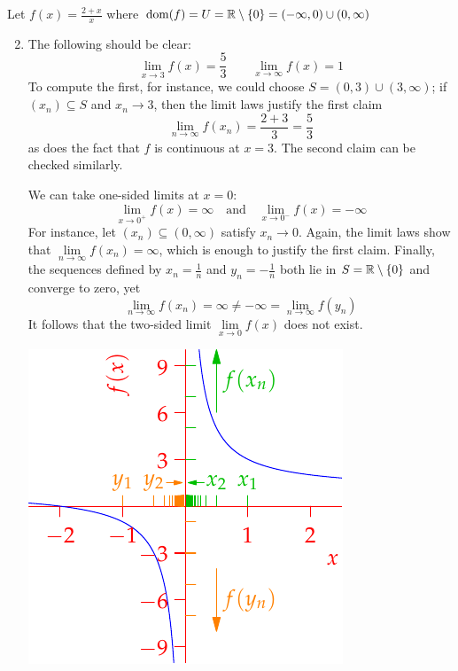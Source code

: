 \begin{examples}{}{}
\exstart Let $f(x)=\frac{2+x}x$ where $\operatorname{dom}(f)=U=\mathbb{R}\setminus\{0\}=(-\infty,0)\cup(0,\infty)$
\begin{enumerate}\setcounter{enumi}{1}
  \item[]	The following should be clear:
	\[\lim\limits_{x\to 3}f(x)=\frac 53\qquad \lim\limits_{x\to \infty}f(x)=1\]
	To compute the first, for instance, we could choose $S=(0,3)\cup(3,\infty)$; if $(x_n)\subseteq S$ and $x_n\to 3$, then the limit laws justify the first claim
	\[\lim_{n\to\infty}f(x_n)=\frac{2+3}{3}=\frac 53\]
	as does the fact that $f$ is continuous at $x=3$. The second claim can be checked similarly.\smallbreak
	\begin{minipage}[t]{0.6\linewidth}\vspace{0pt}
	We can take one-sided limits at $x=0$:
	\[\lim\limits_{x\to 0^+}f(x)=\infty\quad\text{and}\quad\lim\limits_{x\to 0^-}f(x)=-\infty\]
	For instance, let $(x_n)\subseteq (0,\infty)$ satisfy $x_n\to 0$. Again, the limit laws show that $\lim\limits_{n\to\infty}f(x_n)=\infty$, which is enough to justify the first claim.\medbreak
	Finally, the sequences defined by $x_n=\frac 1n$ and $y_n=-\frac 1n$ both lie in $S=\mathbb{R}\setminus\{0\}$ and converge to zero, yet
	\[\lim_{n\to\infty} f(x_n)=\infty\neq-\infty =\lim_{n\to\infty} f(y_n)\]
	It follows that the two-sided limit $\displaystyle\lim\limits_{x\to 0}f(x)$ does not exist.
\end{minipage}\begin{minipage}[t]{0.4\linewidth}\vspace{0pt}
\flushright\includegraphics{limitex2}
\end{minipage}
	

\end{enumerate}
\end{examples}
